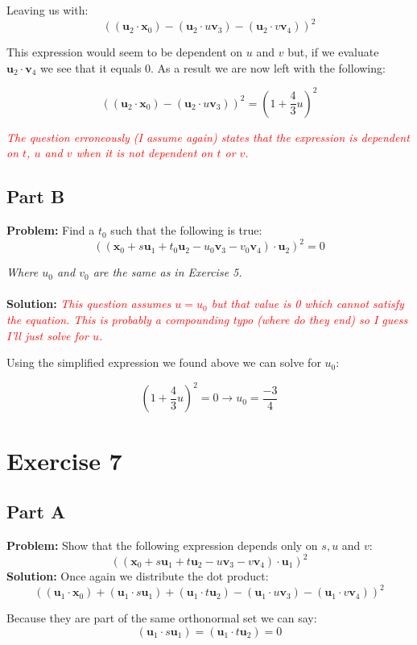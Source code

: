 \documentclass{article}
\begin{document}
Leaving us with:
$$((\mathbf u_2\cdot\mathbf x_0)-(\mathbf u_2\cdot u\mathbf v_3)-(\mathbf u_2\cdot v\mathbf v_4))^2$$

This expression would seem to be dependent on $u$ and $v$ but, if we evaluate $\mathbf u_2\cdot \mathbf v_4$ we see that it equals 0. As a result we are now left with the following:

$$((\mathbf u_2\cdot\mathbf x_0)-(\mathbf u_2\cdot u\mathbf v_3))^2=\left(1+\frac{4}{3}u\right)^2$$

\textit{\textcolor{red}{The question erroneously (I assume again) states that the expression is dependent on $t$, $u$ and $v$ when it is not dependent on $t$ or $v$.}}

\subsection*{Part B}
\textbf{Problem:} Find a $t_0$ such that the following is true:
$$((\mathbf x_0+s\mathbf u_1+t_0\mathbf u_2-u_0\mathbf v_3-v_0\mathbf v_4)\cdot\mathbf u_2)^2=0$$

\textit{Where $u_0$ and $v_0$ are the same as in Exercise 5.}
\\\\
\textbf{Solution:} \textit{\textcolor{red}{This question assumes $u=u_0$ but that value is 0 which cannot satisfy the equation. This is probably a compounding typo (where do they end) so I guess I'll just solve for $u$.}}

Using the simplified expression we found above we can solve for $u_0$:

$$\left(1+\frac{4}{3}u\right)^2=0\rightarrow \boxed{u_0=\frac{-3}{4}}$$

\section*{Exercise 7}
\subsection*{Part A}
\textbf{Problem:} Show that the following expression depends only on $s,u$ and $v$:
$$((\mathbf x_0+s\mathbf u_1+t\mathbf u_2-u\mathbf v_3-v\mathbf v_4)\cdot\mathbf u_1)^2$$
\textbf{Solution:} Once again we distribute the dot product:
$$((\mathbf u_1\cdot\mathbf x_0)+(\mathbf u_1\cdot s\mathbf u_1)+(\mathbf u_1\cdot t\mathbf u_2)-(\mathbf u_1\cdot u\mathbf v_3)-(\mathbf u_1\cdot v\mathbf v_4))^2$$

Because they are part of the same orthonormal set we can say:
$$(\mathbf u_1\cdot s\mathbf u_1)=(\mathbf u_1\cdot t\mathbf u_2)=0$$
\end{document}
